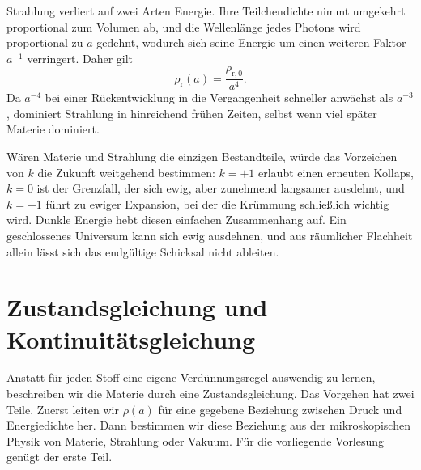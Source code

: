 \begin{classroomqa}
\end{classroomqa}

Strahlung verliert auf zwei Arten Energie. Ihre Teilchendichte nimmt umgekehrt proportional zum Volumen ab, und die Wellenlänge jedes Photons wird proportional zu \(a\) gedehnt, wodurch sich seine Energie um einen weiteren Faktor \(a^{-1}\) verringert. Daher gilt
\begin{equation}
\rho_{\mathrm r}(a)=\frac{\rho_{\mathrm r,0}}{a^4}.
\label{eq:c04-radiation-scaling}
\end{equation}
Da \(a^{-4}\) bei einer Rückentwicklung in die Vergangenheit schneller anwächst als \(a^{-3}\), dominiert Strahlung in hinreichend frühen Zeiten, selbst wenn viel später Materie dominiert.

Wären Materie und Strahlung die einzigen Bestandteile, würde das Vorzeichen von \(k\) die Zukunft weitgehend bestimmen: \(k=+1\) erlaubt einen erneuten Kollaps, \(k=0\) ist der Grenzfall, der sich ewig, aber zunehmend langsamer ausdehnt, und \(k=-1\) führt zu ewiger Expansion, bei der die Krümmung schließlich wichtig wird. Dunkle Energie hebt diesen einfachen Zusammenhang auf. Ein geschlossenes Universum kann sich ewig ausdehnen, und aus räumlicher Flachheit allein lässt sich das endgültige Schicksal nicht ableiten.

\section{Zustandsgleichung und Kontinuitätsgleichung}

Anstatt für jeden Stoff eine eigene Verdünnungsregel auswendig zu lernen, beschreiben wir die Materie durch eine Zustandsgleichung. Das Vorgehen hat zwei Teile. Zuerst leiten wir \(\rho(a)\) für eine gegebene Beziehung zwischen Druck und Energiedichte her. Dann bestimmen wir diese Beziehung aus der mikroskopischen Physik von Materie, Strahlung oder Vakuum. Für die vorliegende Vorlesung genügt der erste Teil.

